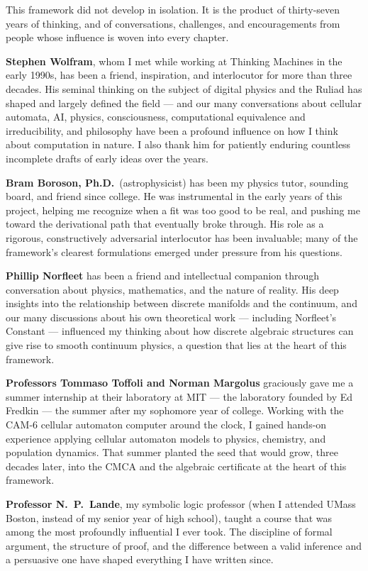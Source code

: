 \documentclass[11pt,openany]{book}
\theoremstyle{remark}
\begin{document}
This framework did not develop in isolation.
It is the product of thirty-seven years of thinking, and of conversations, challenges, and
encouragements from people whose influence is woven into every chapter.

\medskip

\textbf{Stephen Wolfram}, whom I met while working at Thinking Machines in the early 1990s,
has been a friend, inspiration, and interlocutor for more than three decades.
His seminal thinking on the subject of digital physics and the Ruliad has shaped and largely
defined the field --- and our many conversations about cellular automata, AI, physics,
consciousness, computational equivalence and irreducibility, and philosophy have been a
profound influence on how I think about computation in nature.
I also thank him for patiently enduring countless incomplete drafts of early ideas over the years.

\textbf{Bram Boroson, Ph.D.}\ (astrophysicist) has been my physics tutor, sounding board,
and friend since college.
He was instrumental in the early years of this project, helping me recognize when a fit
was too good to be real, and pushing me toward the derivational path that eventually broke
through.
His role as a rigorous, constructively adversarial interlocutor has been invaluable; many
of the framework's clearest formulations emerged under pressure from his questions.

\textbf{Phillip Norfleet} has been a friend and intellectual companion through conversation
about physics, mathematics, and the nature of reality.
His deep insights into the relationship between discrete manifolds and the continuum, and
our many discussions about his own theoretical work --- including Norfleet's Constant ---
influenced my thinking about how discrete algebraic structures can give rise to smooth
continuum physics, a question that lies at the heart of this framework.

\textbf{Professors Tommaso Toffoli and Norman Margolus} graciously gave me a summer
internship at their laboratory at MIT --- the laboratory founded by Ed Fredkin --- the
summer after my sophomore year of college.
Working with the CAM-6 cellular automaton computer around the clock, I gained
hands-on experience applying cellular automaton models to physics, chemistry, and population
dynamics.
That summer planted the seed that would grow, three decades later, into the CMCA and the
algebraic certificate at the heart of this framework.

\textbf{Professor N.~P.\ Lande}, my symbolic logic professor (when I attended UMass Boston, instead of my senior year of high school), taught a course that
was among the most profoundly influential I ever took.
The discipline of formal argument, the structure of proof, and the difference between
a valid inference and a persuasive one have shaped everything I have written since.
\end{document}
